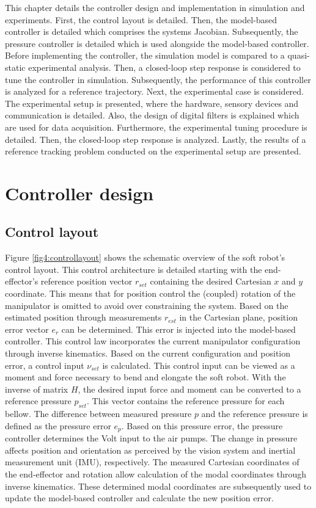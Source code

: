

This chapter details the controller design and implementation in simulation and experiments. First, the control layout is detailed. Then, the model-based controller is detailed which comprises the systems Jacobian. Subsequently, the pressure controller is detailed which is used alongside the model-based controller. Before implementing the controller, the simulation model is compared to a quasi-static experimental analysis. Then, a closed-loop step response is considered to tune the controller in simulation. Subsequently, the performance of this controller is analyzed for a reference trajectory. Next, the experimental case is considered. The experimental setup is presented, where the hardware, sensory devices and communication is detailed. Also, the design of digital filters is explained which are used for data acquisition. Furthermore, the experimental tuning procedure is detailed. Then, the closed-loop step response is analyzed. Lastly, the results of a reference tracking problem conducted on the experimental setup are presented.



\section{Controller design}
\label{chap4a}

\subsection{Control layout}

Figure \ref{fig4:controllayout} shows the schematic overview of the soft robot's control layout. This control architecture is detailed starting with the end-effector's reference position vector $r_{set}$ containing the desired Cartesian $x$ and $y$ coordinate. This means that for position control the (coupled) rotation of the manipulator is omitted to avoid over constraining the system. Based on the estimated position through measurements $r_{est}$ in the Cartesian plane, position error vector $e_r$ can be determined. This error is injected into the model-based controller. This control law incorporates the current manipulator configuration through inverse kinematics. Based on the current configuration and position error, a control input $\nu_{set}$ is calculated. This control input can be viewed as a moment and force necessary to bend and elongate the soft robot. With the inverse of matrix $H$, the desired input force and moment can be converted to a reference pressure $p_{set}$. This vector contains the reference pressure for each bellow. The difference between measured pressure $p$ and the reference pressure is defined as the pressure error $e_p$. Based on this pressure error, the pressure controller determines the Volt input to the air pumps. The change in pressure affects position and orientation as perceived by the vision system and inertial measurement unit (IMU), respectively. The measured Cartesian coordinates of the end-effector and rotation allow calculation of the modal coordinates through inverse kinematics. These determined modal coordinates are subsequently used to update the model-based controller and calculate the new position error. 


